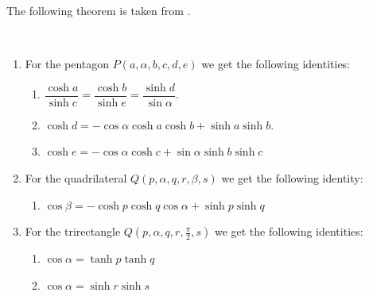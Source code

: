 \begin{figure}[h]
\begin{minipage}{.5\textwidth}
		\label{fig:test3}
	\end{minipage}
\end{figure}

\noindent
The following theorem is taken from \cite{PB}.
\begin{theorem} {\ } 
	\label{thm:trigidentities}
	\begin{enumerate}
		\item For the pentagon $P(a,\alpha,b,c,d,e)$ we get the following identities:\vspace{0.8em}
		\begin{enumerate}
			\item $\dfrac{\cosh{a}}{\sinh{c}} = \dfrac{\cosh{b}}{\sinh{e}} =\dfrac{\sinh{d}}{\sin{\alpha}}.$\\
			\item $\cosh{d} = -\cos{\alpha} \cosh{a} \cosh{b} + \sinh{a} \sinh{b}.$ \vspace{0.8em}
			\item $\cosh{e} = -\cos{\alpha} \cosh{c} + \sin{\alpha} \sinh{b} \sinh{c}$ \vspace{0.8em}
		\end{enumerate}
		
		\item For the quadrilateral $Q(p,\alpha,q,r,\beta,s)$ we get the following identity:\vspace{0.8em}
		\begin{enumerate}
			\item $\cos{\beta} =  - \cosh{p} \cosh{q} \cos{\alpha} + \sinh{p}\sinh{q}$ \vspace{0.8em}
		\end{enumerate}
	
		\item For the trirectangle $Q(p, \alpha,q,r,\frac{\pi}{2},s)$ we get the following identities:\vspace{0.8em}
		\begin{enumerate}
			\item $\cos{\alpha} = \tanh{p} \tanh{q}$
			\vspace{0.8em}
			\item $\cos{\alpha} = \sinh{r} \sinh{s}$
		\end{enumerate}
	\end{enumerate}

	
\end{theorem}

